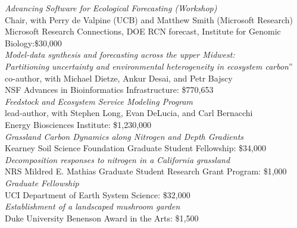 \documentclass{xetexCV}
\begin{document}

\textit{Advancing Software for Ecological Forecasting (Workshop)} \\   Chair, with Perry de Valpine (UCB) and Matthew Smith (Microsoft Research)\\ Microsoft Research Connections, DOE RCN forecast, Institute for Genomic Biology:\$30,000 \\ 


\textit{Model-data synthesis and forecasting across the upper Midwest:  \\ Partitioning uncertainty and environmental heterogeneity in ecosystem carbon}''  \\ co-author, with Michael Dietze, Ankur Desai, and Petr Bajscy \\  NSF Advances in Bioinformatics Infrastructure: \$770,653\\ 

\textit{Feedstock and Ecosystem Service Modeling Program}   \\ lead-author, with Stephen Long, Evan DeLucia, and Carl Bernacchi\\
Energy Biosciences Institute: \$1,230,000\\

\textit{Grassland Carbon Dynamics along Nitrogen and Depth Gradients}  \\
Kearney Soil Science Foundation Graduate Student Fellowship: \$34,000 \\ 

\textit{Decomposition responses to nitrogen in a California grassland} \\
NRS Mildred E. Mathias Graduate Student Research Grant Program: \$1,000  \\

\textit{Graduate Fellowship} \\
UCI Department of Earth System Science: \$32,000\\

\textit{Establishment of a landscaped mushroom garden}   \\ Duke University Benenson Award in the Arts: \$1,500
\end{document}
